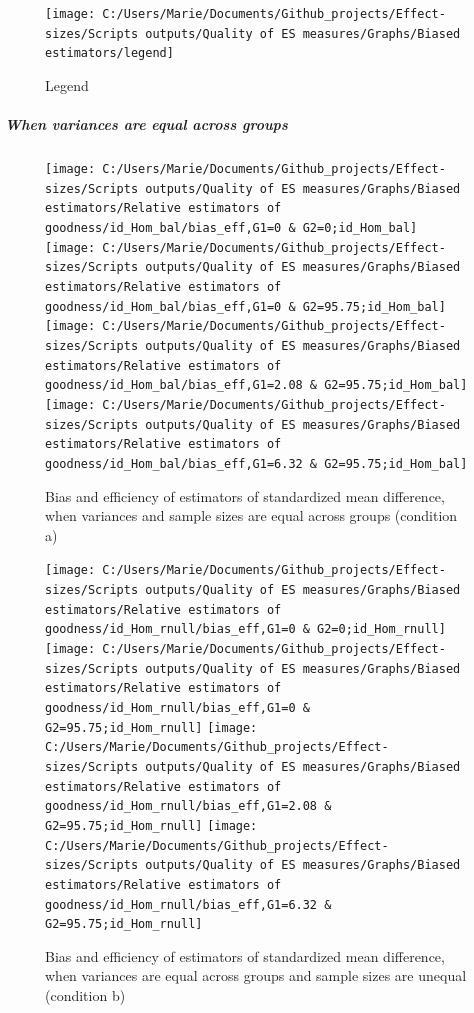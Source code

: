 \documentclass[
  man,floatsintext]{apa6}
\begin{document}
\begin{figure}
\texttt{[image: C:/Users/Marie/Documents/Github\_projects/Effect-sizes/Scripts outputs/Quality of ES measures/Graphs/Biased estimators/legend]} \caption{Legend}\label{fig:legend}
\end{figure}

\hypertarget{when-variances-are-equal-across-groups}{%
\subparagraph{When variances are equal across groups}\label{when-variances-are-equal-across-groups}}

\begin{figure}

{\centering \texttt{[image: C:/Users/Marie/Documents/Github\_projects/Effect-sizes/Scripts outputs/Quality of ES measures/Graphs/Biased estimators/Relative estimators of goodness/id\_Hom\_bal/bias\_eff,G1=0 \& G2=0;id\_Hom\_bal]} \texttt{[image: C:/Users/Marie/Documents/Github\_projects/Effect-sizes/Scripts outputs/Quality of ES measures/Graphs/Biased estimators/Relative estimators of goodness/id\_Hom\_bal/bias\_eff,G1=0 \& G2=95.75;id\_Hom\_bal]} \texttt{[image: C:/Users/Marie/Documents/Github\_projects/Effect-sizes/Scripts outputs/Quality of ES measures/Graphs/Biased estimators/Relative estimators of goodness/id\_Hom\_bal/bias\_eff,G1=2.08 \& G2=95.75;id\_Hom\_bal]} \texttt{[image: C:/Users/Marie/Documents/Github\_projects/Effect-sizes/Scripts outputs/Quality of ES measures/Graphs/Biased estimators/Relative estimators of goodness/id\_Hom\_bal/bias\_eff,G1=6.32 \& G2=95.75;id\_Hom\_bal]} 

}

\caption{Bias and efficiency of estimators of standardized mean difference, when variances and sample sizes are equal across groups (condition a)}\label{fig:idHombal}
\end{figure}

\begin{figure}

{\centering \texttt{[image: C:/Users/Marie/Documents/Github\_projects/Effect-sizes/Scripts outputs/Quality of ES measures/Graphs/Biased estimators/Relative estimators of goodness/id\_Hom\_rnull/bias\_eff,G1=0 \& G2=0;id\_Hom\_rnull]} \texttt{[image: C:/Users/Marie/Documents/Github\_projects/Effect-sizes/Scripts outputs/Quality of ES measures/Graphs/Biased estimators/Relative estimators of goodness/id\_Hom\_rnull/bias\_eff,G1=0 \& G2=95.75;id\_Hom\_rnull]} \texttt{[image: C:/Users/Marie/Documents/Github\_projects/Effect-sizes/Scripts outputs/Quality of ES measures/Graphs/Biased estimators/Relative estimators of goodness/id\_Hom\_rnull/bias\_eff,G1=2.08 \& G2=95.75;id\_Hom\_rnull]} \texttt{[image: C:/Users/Marie/Documents/Github\_projects/Effect-sizes/Scripts outputs/Quality of ES measures/Graphs/Biased estimators/Relative estimators of goodness/id\_Hom\_rnull/bias\_eff,G1=6.32 \& G2=95.75;id\_Hom\_rnull]} 

}

\caption{Bias and efficiency of estimators of standardized mean difference, when variances are equal across groups and sample sizes are unequal (condition b)}\label{fig:idHomrnull}
\end{figure}
\end{document}
